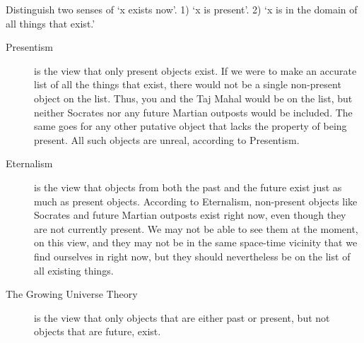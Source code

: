 \documentclass[]{article}
\begin{document}
Distinguish two senses of `x exists now'. 1) `x is present'. 2) `x is in the domain of all things that exist.' 

\begin{description}
\item[Presentism] is the view that only present objects exist. If we were to make an accurate list of all the things that exist, there would not be a single non-present object on the list. Thus, you and the Taj Mahal would be on the list, but neither Socrates nor any future Martian outposts would be included. The same goes for any other putative object that lacks the property of being present. All such objects are unreal, according to Presentism.
\item[Eternalism] is the view that objects from both the past and the future exist just as much as present objects. According to Eternalism, non-present objects like Socrates and future Martian outposts exist right now, even though they are not currently present. We may not be able to see them at the moment, on this view, and they may not be in the same space-time vicinity that we find ourselves in right now, but they should nevertheless be on the list of all existing things.
\item[The Growing Universe Theory] is the view that only objects that are either past or present, but not objects that are future, exist. 
\end{description}
\end{document}
